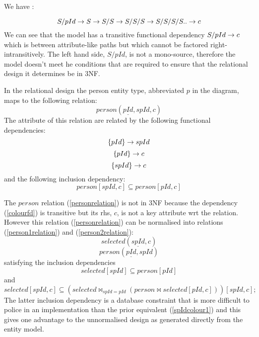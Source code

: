We have :

\begin{equation}
S/pId \rightarrow S \rightarrow S/S \rightarrow S/S/S \rightarrow S/S/S/S .. \rightarrow c
\end{equation}
We can see that the model has a transitive functional dependency $S/pId \rightarrow c$ which is between
attribute-like paths but which cannot be factored right-intransitively. The left hand side, $S/pId$, is not a mono-source, therefore the model doesn't meet he conditions that are required to ensure that the relational design it determines  be in 3NF.

In the relational design the person entity type, abbreviated $p$ in the diagram, maps to the following relation:
\begin{equation}
\label{personrelation}
person(\underline{pId}, spId, c)
\end{equation}
The  attribute of this relation are related by the following  functional dependencies:
\begin{equation}
\left\{pId\right\} \rightarrow spId
\end{equation}
\begin{equation}
\label{colourfd}
\left\{pId\right\} \rightarrow c
\end{equation}
\begin{equation}
\left\{spId\right\} \rightarrow c
\end{equation}
and the following  inclusion dependency:
\begin{equation}
\label{spIdcolour1}
person[spId,c] \subseteq person[pId,c]
\end{equation}

The $person$ relation (\ref{personrelation}) is not in 3NF because the dependency (\ref{colourfd}) is transitive but its rhs, $c$, is not a key attribute wrt the relation. However this
relation (\ref{personrelation}) can be normalised into relations (\ref{person1relation}) and (\ref{person2relation}):
\begin{equation}
\label{person1relation}
selected(\underline{spId},  c)
\end{equation}
\begin{equation}
\label{person2relation}
person(\underline{pId}, spId)
\end{equation}
satisfying the inclusion dependencies
\begin{equation}
selected[spId] \subseteq person[pId]
\end{equation}
and
\begin{equation}
\label{spIdcolour}
selected[spId,c] \subseteq (selected \bowtie_{spId=pId} 
                                       (person \bowtie selected [pId,c]) )
																			[spId,c];
\end{equation}
The latter inclusion dependency is a database constraint that
is more difficult to police in an implementation
than the prior equivalent (\ref{spIdcolour1}) and
this gives one advantage to the unnormalised design as generated
directly from the entity model. 

